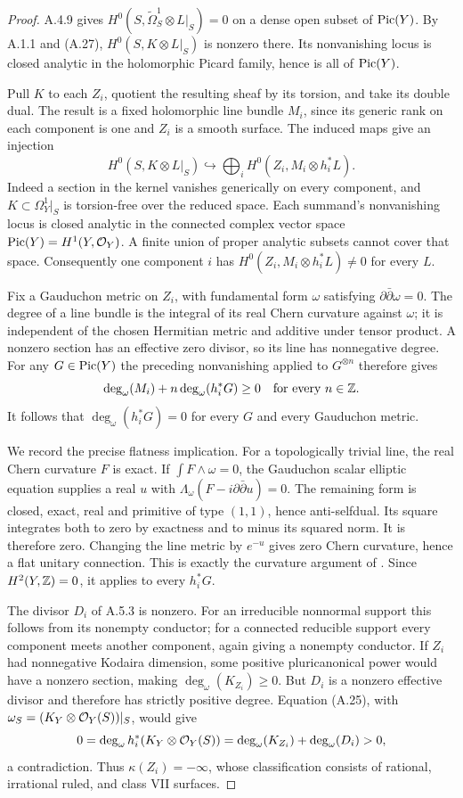 \begin{proof}
A.4.9 gives $H^0(S,\widetilde\Omega_S^1\otimes L|_S)=0$ on a dense open subset of $\operatorname{Pic}(Y)$. By A.1.1 and (A.27), $H^0(S,K\otimes L|_S)$ is nonzero there. Its nonvanishing locus is closed analytic in the holomorphic Picard family, hence is all of $\operatorname{Pic}(Y)$.

Pull $K$ to each $Z_i$, quotient the resulting sheaf by its torsion, and take its double dual. The result is a fixed holomorphic line bundle $M_i$, since its generic rank on each component is one and $Z_i$ is a smooth surface. The induced maps give an injection
\[
 H^0(S,K\otimes L|_S)\hookrightarrow
       \bigoplus_i H^0(Z_i,M_i\otimes h_i^*L).
 \tag{A.29}
\]
Indeed a section in the kernel vanishes generically on every component, and $K\subset\Omega_Y^1|_S$ is torsion-free over the reduced space. Each summand's nonvanishing locus is closed analytic in the connected complex vector space $\operatorname{Pic}(Y)=H^1(Y,\mathcal O_Y)$. A finite union of proper analytic subsets cannot cover that space. Consequently one component $i$ has
$H^0(Z_i,M_i\otimes h_i^*L)\ne0$ for every $L$.

Fix a Gauduchon metric on $Z_i$, with fundamental form $\omega$ satisfying $\partial\bar\partial\omega=0$. The degree of a line bundle is the integral of its real Chern curvature against $\omega$; it is independent of the chosen Hermitian metric and additive under tensor product. A nonzero section has an effective zero divisor, so its line has nonnegative degree. For any $G\in\operatorname{Pic}(Y)$ the preceding nonvanishing applied to $G^{\otimes n}$ therefore gives
\[
 \deg_\omega(M_i)+n\deg_\omega(h_i^*G)\ge0
 \quad\hbox{for every }n\in\mathbb Z.
\]
It follows that $\deg_\omega(h_i^*G)=0$ for every $G$ and every Gauduchon metric.

We record the precise flatness implication. For a topologically trivial line, the real Chern curvature $F$ is exact. If $\int F\wedge\omega=0$, the Gauduchon scalar elliptic equation supplies a real $u$ with $\Lambda_\omega(F-i\partial\bar\partial u)=0$. The remaining form is closed, exact, real and primitive of type $(1,1)$, hence anti-selfdual. Its square integrates both to zero by exactness and to minus its squared norm. It is therefore zero. Changing the line metric by $e^{-u}$ gives zero Chern curvature, hence a flat unitary connection. This is exactly the curvature argument of \cite[Lemma~2.3(1)--(2)]{Teleman2006}. Since $H^2(Y,\mathbb Z)=0$, it applies to every $h_i^*G$.

The divisor $D_i$ of A.5.3 is nonzero. For an irreducible nonnormal support this follows from its nonempty conductor; for a connected reducible support every component meets another component, again giving a nonempty conductor. If $Z_i$ had nonnegative Kodaira dimension, some positive pluricanonical power would have a nonzero section, making $\deg_\omega(K_{Z_i})\ge0$. But $D_i$ is a nonzero effective divisor and therefore has strictly positive degree. Equation (A.25), with $\omega_S=(K_Y\otimes\mathcal O_Y(S))|_S$, would give
\[
 0=\deg_\omega h_i^*(K_Y\otimes\mathcal O_Y(S))
   =\deg_\omega(K_{Z_i})+\deg_\omega(D_i)>0,
\]
a contradiction. Thus $\kappa(Z_i)=-\infty$, whose classification consists of rational, irrational ruled, and class VII surfaces.


\end{proof}
